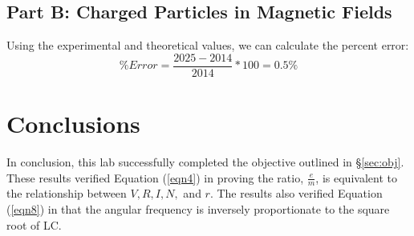 \documentclass[titlepage]{article}
\begin{document}
\subsection{Part B: Charged Particles in Magnetic Fields}\label{sub:part_b_charged_particles_in_magnetic_fields-dor}
Using the experimental and theoretical values, we can calculate the percent error:
\[
	\% Error = \frac{2025 - 2014}{2014} * 100 = 0.5\%
\]

\section{Conclusions}\label{sec:conclusions}
In conclusion, this lab successfully completed the objective outlined in \S \ref{sec:obj}. These results verified Equation (\ref{eqn4}) in proving the ratio, $\frac{e}{m}$, is equivalent to the relationship between $V, R, I, N, $ and $r$. The results also verified Equation (\ref{eqn8}) in that the angular frequency is inversely proportionate to the square root of LC.
\end{document}
